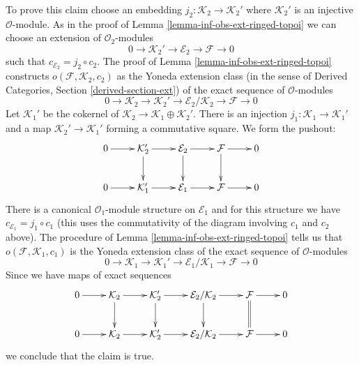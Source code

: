 \begin{remark}
\medskip\noindent
To prove this claim choose an embedding
$j_2 : \mathcal{K}_2 \to \mathcal{K}_2'$
where $\mathcal{K}_2'$ is an injective $\mathcal{O}$-module.
As in the proof of Lemma \ref{lemma-inf-obs-ext-ringed-topoi}
we can choose an extension of $\mathcal{O}_2$-modules
$$
0 \to \mathcal{K}_2' \to \mathcal{E}_2 \to \mathcal{F} \to 0
$$
such that $c_{\mathcal{E}_2} = j_2 \circ c_2$.
The proof of Lemma \ref{lemma-inf-obs-ext-ringed-topoi} constructs
$o(\mathcal{F}, \mathcal{K}_2, c_2)$
as the Yoneda extension class (in the sense of
Derived Categories, Section \ref{derived-section-ext})
of the exact sequence of $\mathcal{O}$-modules
$$
0 \to
\mathcal{K}_2 \to \mathcal{K}_2' \to
\mathcal{E}_2/\mathcal{K}_2 \to
\mathcal{F} \to 0
$$
Let $\mathcal{K}_1'$ be the cokernel of
$\mathcal{K}_2 \to \mathcal{K}_1 \oplus \mathcal{K}_2'$.
There is an injection $j_1 : \mathcal{K}_1 \to \mathcal{K}_1'$
and a map $\mathcal{K}_2' \to \mathcal{K}_1'$ forming
a commutative square. We form the pushout:
$$
\xymatrix{
0 \ar[r] &
\mathcal{K}_2' \ar[r] \ar[d] &
\mathcal{E}_2 \ar[r] \ar[d] &
\mathcal{F} \ar[r] \ar[d] & 0 \\
0 \ar[r] &
\mathcal{K}_1' \ar[r] &
\mathcal{E}_1 \ar[r] &
\mathcal{F} \ar[r] & 0
}
$$
There is a canonical $\mathcal{O}_1$-module structure on
$\mathcal{E}_1$ and for this structure we have
$c_{\mathcal{E}_1} = j_1 \circ c_1$ (this uses the commutativity
of the diagram involving $c_1$ and $c_2$ above).
The procedure of Lemma \ref{lemma-inf-obs-ext-ringed-topoi}
tells us that $o(\mathcal{F}, \mathcal{K}_1, c_1)$
is the Yoneda extension class of the exact sequence
of $\mathcal{O}$-modules
$$
0 \to
\mathcal{K}_1 \to
\mathcal{K}_1' \to
\mathcal{E}_1/\mathcal{K}_1 \to
\mathcal{F} \to 0
$$
Since we have maps of exact sequences
$$
\xymatrix{
0 \ar[r] &
\mathcal{K}_2 \ar[d] \ar[r] &
\mathcal{K}_2' \ar[d] \ar[r] &
\mathcal{E}_2/\mathcal{K}_2 \ar[r] \ar[d] &
\mathcal{F} \ar[r] \ar@{=}[d] &
0 \\
0 \ar[r] &
\mathcal{K}_2 \ar[r] &
\mathcal{K}_2' \ar[r] &
\mathcal{E}_2/\mathcal{K}_2 \ar[r] &
\mathcal{F} \ar[r] &
0
}
$$
we conclude that the claim is true.
\end{remark}

